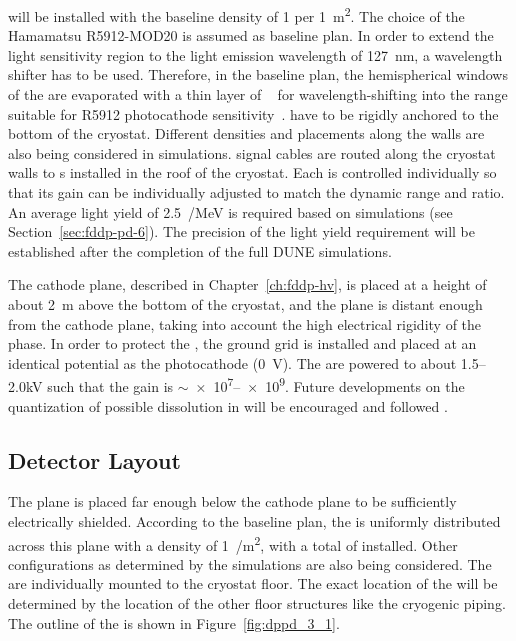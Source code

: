  will be installed with the baseline density of \num{1} per \SI{1}{m^2}. The choice of the Hamamatsu R5912-MOD20  %
is assumed as baseline plan. In order to extend the  light sensitivity region to the \lar light emission wavelength of \SI{127}{nm}, a wavelength shifter has to be used. Therefore, in the baseline plan, the hemispherical windows of the  are evaporated with a thin layer of ~\cite{tpb} for wavelength-shifting into the range suitable for R5912  photocathode sensitivity~\cite{hamamatsu-5912}.  have to be rigidly anchored to the bottom of the cryostat. Different  densities and placements along the walls are also being considered in simulations.  signal cables are routed along the cryostat walls to \fdth{}s installed in the roof of the cryostat. Each  is controlled individually so that its gain can be individually adjusted to match the  dynamic range and  ratio. An average light yield of \SI{2.5}{\phel/MeV} is required based on  simulations (see Section~\ref{sec:fddp-pd-6}). The precision of the light yield requirement will be established after the completion of the full DUNE simulations.

The cathode plane, described in Chapter~\ref{ch:fddp-hv}, %
 is placed at a height of about \SI{2}{m} above the bottom of the cryostat, and the  plane is distant enough from the cathode plane, taking into account the high electrical rigidity of the \lar phase. In order to protect the , the ground grid is installed and placed at an identical potential as the  photocathode (\SI{0}{V}). The  are powered to about \numrange{1.5}{2.0}\si{kV} such that the  gain is $\sim$\numrange{e7}{e9}. Future developments on the quantization of possible  dissolution in \lar will be encouraged and followed \cite{TPBdiss}.

\subsection{Detector Layout}
\label{sec:fddp-pd-1.4}

The  plane is placed far enough below the cathode plane to be sufficiently electrically shielded. According to the baseline plan, the  is uniformly distributed across this plane with a density of \SI{1}{/m^2}, with a total of \dpnumpmtch {} installed. Other  configurations as determined by the simulations are also being considered. The  are individually mounted to the cryostat floor. The exact location of the  will be determined by the location of the other floor structures like the cryogenic piping. The outline of the  is shown in Figure~\ref{fig:dppd_3_1}.

